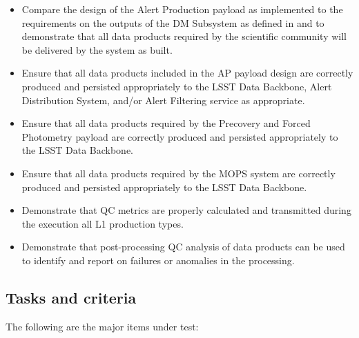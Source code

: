 \documentclass[DM,lsstdraft,STS,toc]{lsstdoc}
\begin{document}
\begin{itemize}

  \item{Compare the design of the Alert Production payload as
  implemented to the requirements on the outputs of the DM Subsystem as
  defined in  and  to demonstrate that all data
  products required by the scientific community will be delivered by the
  system as built.}

  \item{Ensure that all data products included in the AP payload design are
  correctly produced and persisted appropriately to the LSST
  Data Backbone, Alert Distribution System, and/or Alert Filtering service
  as appropriate.}

  \item{Ensure that all data products required by the Precovery and Forced
  Photometry payload are correctly
  produced and persisted appropriately to the LSST Data Backbone.}

  \item{Ensure that all data products required by the MOPS system are correctly
  produced and persisted appropriately to the LSST Data Backbone.}

  \item{Demonstrate that QC metrics are properly calculated and transmitted
  during the execution all L1 production types.}

  \item{Demonstrate that post-processing QC analysis of data products can be
  used to identify and report on failures or anomalies in the processing.}

\end{itemize}

\subsection{Tasks and criteria}
\label{sec:tasks}

The following are the major items under test:
\end{document}
